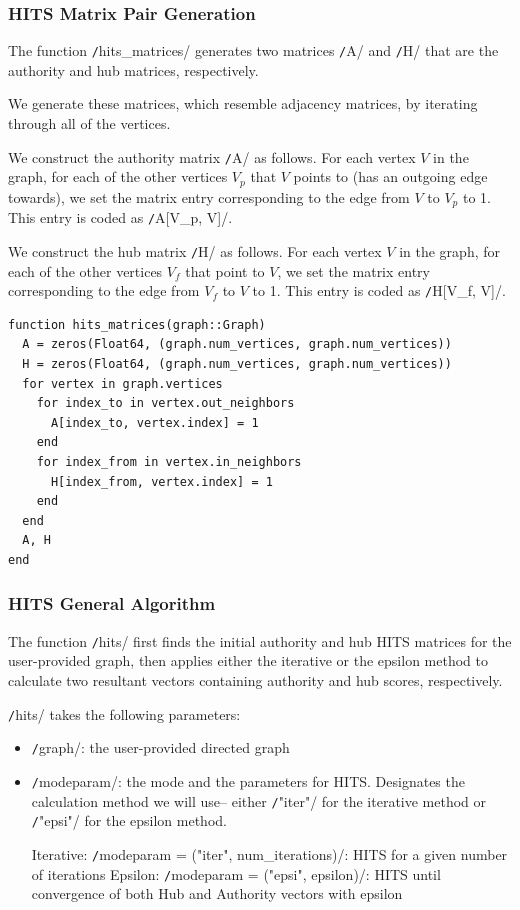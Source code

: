 \documentclass[12pt, titlepage, twoside]{amsart}
\begin{document}
\subsubsection{HITS Matrix Pair Generation}

The function \texttt/hits_matrices/ generates two matrices \texttt/A/ and \texttt/H/
that are the authority and hub matrices, respectively.

We generate these matrices, which resemble adjacency matrices, by iterating through all of the vertices.

We construct the authority matrix \texttt/A/ as follows.
For each vertex $V$ in the graph, for each of the other vertices $V_p$ that $V$ points to
(has an outgoing edge towards),
we set the matrix entry corresponding to the edge from $V$ to $V_p$ to 1.
This entry is coded as \texttt/A[V_p, V]/.

We construct the hub matrix \texttt/H/ as follows.
For each vertex $V$ in the graph, for each of the other vertices $V_f$ that point to $V$,
we set the matrix entry corresponding to the edge from $V_f$ to $V$ to 1.
This entry is coded as \texttt/H[V_f, V]/.

\begin{verbatim}
function hits_matrices(graph::Graph)
  A = zeros(Float64, (graph.num_vertices, graph.num_vertices))
  H = zeros(Float64, (graph.num_vertices, graph.num_vertices))
  for vertex in graph.vertices
    for index_to in vertex.out_neighbors
      A[index_to, vertex.index] = 1
    end
    for index_from in vertex.in_neighbors
      H[index_from, vertex.index] = 1
    end
  end
  A, H
end
\end{verbatim}

\subsubsection{HITS General Algorithm}

The function \texttt/hits/ first finds the initial authority and hub HITS matrices
for the user-provided graph,
then applies either the iterative or the epsilon method to calculate
two resultant vectors containing authority and hub scores, respectively.

\texttt/hits/ takes the following parameters:

\begin{itemize}[label={}]
\item \texttt/graph/: the user-provided directed graph

\item \texttt/modeparam/: the mode and the parameters for HITS.
Designates the calculation method we will use--
either \texttt/"iter"/ for the iterative method or \texttt/"epsi"/ for the epsilon method.

Iterative: \texttt/modeparam = ("iter", num_iterations)/:
HITS for a given number of iterations
Epsilon: \texttt/modeparam = ("epsi", epsilon)/: HITS until convergence of
both Hub and Authority vectors with epsilon
\end{itemize}
\end{document}
